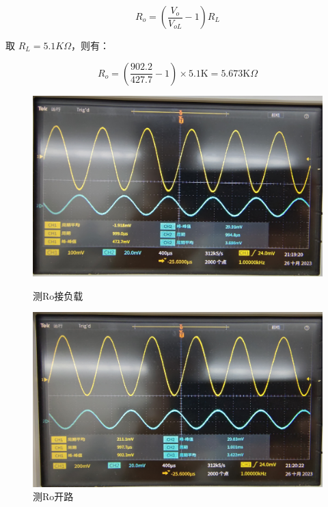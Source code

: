 \documentclass[a4paper]{article}
\theoremstyle{definition}
\theoremstyle{plain}
\theoremstyle{remark}
\begin{document}
\begin{equation}
	R_o  = (\frac{V_o}{V_{oL}}-1)R_L
\end{equation}

取 $R_L = 5.1K\Omega$，则有：

\begin{equation}
	R_o  = (\frac{902.2}{427.7}-1)\times 5.1\mathrm{K} =5.673 \mathrm{K}\Omega
\end{equation}

\begin{figure}[H]
	\begin{minipage}[t]{0.5\linewidth}
		\centering
		\includegraphics[width=1\textwidth]{测Ro接负载}
		\caption{测Ro接负载}
		\label{测Ro接负载}
	\end{minipage}%
	\begin{minipage}[t]{0.5\linewidth}
		\centering
		\includegraphics[width=1\textwidth]{测Ro开路}
		\caption{测Ro开路}
		\label{测Ro开路}
	\end{minipage}
\end{figure}
\end{document}
